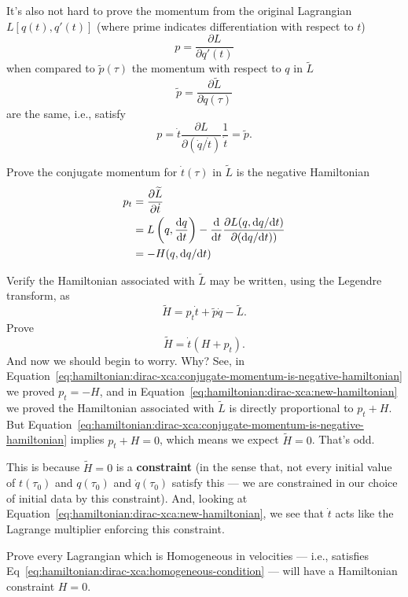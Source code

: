 \begin{exercise}
It's also not hard to prove the momentum from the original Lagrangian $L[q(t),q'(t)]$ (where prime indicates differentiation with respect to $t$) 
\begin{equation}
p = \frac{\partial L}{\partial q'(t)}
\end{equation}
when compared to $\widetilde{p}(\tau)$ the momentum with respect to $q$ in $\widetilde{L}$
\begin{equation}
\widetilde{p} = \frac{\partial \widetilde{L}}{\partial \dot{q}(\tau)}
\end{equation}
are the same, i.e., satisfy
\begin{equation}
p = \dot{t}\frac{\partial L}{\partial (\dot{q}/\dot{t})}\frac{1}{\dot{t}} = \widetilde{p}.
\end{equation}
\end{exercise}

\begin{exercise}
Prove the conjugate momentum for $\dot{t}(\tau)$ in $\widetilde{L}$ is
the negative Hamiltonian
\begin{subequations}\label{eq:hamiltonian:dirac-xca:conjugate-momentum-is-negative-hamiltonian}
\begin{align}
p_{t} &= \frac{\partial\widetilde{L}}{\partial\dot{t}} \\
&= L\left(q,\frac{\mathrm{d} q}{\mathrm{d} t}\right) - \frac{\mathrm{d} }{\mathrm{d} t}\frac{\partial L(q,\mathrm{d} q/\mathrm{d} t)}{\partial(\mathrm{d} q/\mathrm{d} t))}\\
&= -H(q,\mathrm{d} q/\mathrm{d} t)
\end{align}
\end{subequations}
\end{exercise}

\begin{exercise}
Verify the Hamiltonian associated with $\widetilde{L}$ may be written, using the Legendre transform, as
\begin{equation}
\widetilde{H} = p_{t}\dot{t} + \widetilde{p}\dot{q} - \widetilde{L}.
\end{equation}
Prove
\begin{equation}\label{eq:hamiltonian:dirac-xca:new-hamiltonian}
\widetilde{H} = \dot{t}(H + p_{t}).
\end{equation}
And now we should begin to worry. Why? See, in Equation~\eqref{eq:hamiltonian:dirac-xca:conjugate-momentum-is-negative-hamiltonian} we proved $p_{t}=-H$, and in Equation~\eqref{eq:hamiltonian:dirac-xca:new-hamiltonian} we proved the Hamiltonian associated with $\widetilde{L}$ is directly proportional to $p_{t}+H$. But Equation~\eqref{eq:hamiltonian:dirac-xca:conjugate-momentum-is-negative-hamiltonian} implies $p_{t}+H=0$, which means we expect $\widetilde{H}=0$. That's odd.

This is because $\widetilde{H}=0$ is a \textbf{constraint} (in the sense that, not every initial value of $t(\tau_{0})$ and $q(\tau_{0})$ and $\dot{q}(\tau_{0})$ satisfy this --- we are constrained in our choice of initial data by this constraint). And, looking at Equation~\eqref{eq:hamiltonian:dirac-xca:new-hamiltonian}, we see that $\dot{t}$ acts like the Lagrange multiplier enforcing this constraint.
\end{exercise}

\begin{exercise}
Prove every Lagrangian which is Homogeneous in velocities --- i.e., satisfies Eq~\eqref{eq:hamiltonian:dirac-xca:homogeneous-condition} --- will have a Hamiltonian constraint $H=0$.
\end{exercise}